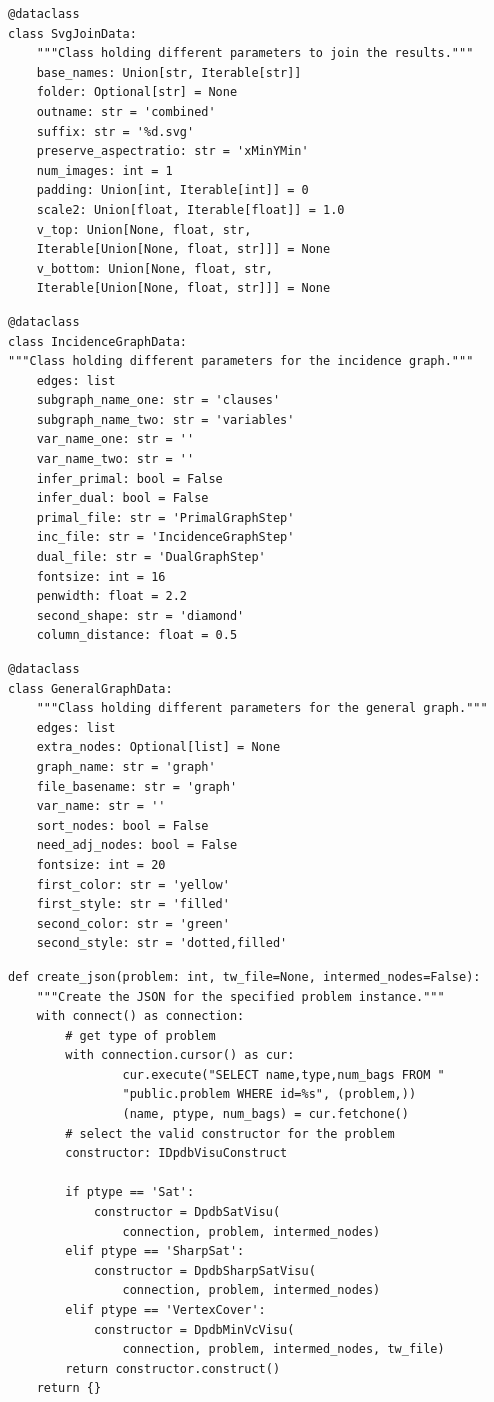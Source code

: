 \documentclass[a4paper, 12pt, bibliography=totoc]{scrartcl}
\begin{document}
\begin{lstlisting}[style=custompy, caption={SvgJoinData}, label={lst:svgjoindataclass}]
@dataclass
class SvgJoinData:
	"""Class holding different parameters to join the results."""
	base_names: Union[str, Iterable[str]]
	folder: Optional[str] = None
	outname: str = 'combined'
	suffix: str = '%d.svg'
	preserve_aspectratio: str = 'xMinYMin'
	num_images: int = 1
	padding: Union[int, Iterable[int]] = 0
	scale2: Union[float, Iterable[float]] = 1.0
	v_top: Union[None, float, str, 
	Iterable[Union[None, float, str]]] = None
	v_bottom: Union[None, float, str, 
	Iterable[Union[None, float, str]]] = None	
\end{lstlisting}

\begin{lstlisting}[style=custompy, caption={IncidenceGraphData}, label={lst:incidencedata}]
@dataclass
class IncidenceGraphData:
"""Class holding different parameters for the incidence graph."""
	edges: list
	subgraph_name_one: str = 'clauses'
	subgraph_name_two: str = 'variables'
	var_name_one: str = ''
	var_name_two: str = ''
	infer_primal: bool = False
	infer_dual: bool = False
	primal_file: str = 'PrimalGraphStep'
	inc_file: str = 'IncidenceGraphStep'
	dual_file: str = 'DualGraphStep'
	fontsize: int = 16
	penwidth: float = 2.2
	second_shape: str = 'diamond'
	column_distance: float = 0.5
\end{lstlisting}\pagebreak

\begin{lstlisting}[style=custompy, caption={GeneralGraphData}, label={lst:gengraphdata}]
@dataclass
class GeneralGraphData:
	"""Class holding different parameters for the general graph."""
	edges: list
	extra_nodes: Optional[list] = None
	graph_name: str = 'graph'
	file_basename: str = 'graph'
	var_name: str = ''
	sort_nodes: bool = False
	need_adj_nodes: bool = False
	fontsize: int = 20
	first_color: str = 'yellow'
	first_style: str = 'filled'
	second_color: str = 'green'
	second_style: str = 'dotted,filled'
\end{lstlisting}

\begin{lstlisting}[style=custompy, caption={Construct\_dpdb\_visu.py}, label={lst:create-json}]
def create_json(problem: int, tw_file=None, intermed_nodes=False):
	"""Create the JSON for the specified problem instance."""
	with connect() as connection:
		# get type of problem
		with connection.cursor() as cur:
				cur.execute("SELECT name,type,num_bags FROM "
				"public.problem WHERE id=%s", (problem,))
				(name, ptype, num_bags) = cur.fetchone()	
		# select the valid constructor for the problem
		constructor: IDpdbVisuConstruct
		
		if ptype == 'Sat':
			constructor = DpdbSatVisu(
				connection, problem, intermed_nodes)
		elif ptype == 'SharpSat':
			constructor = DpdbSharpSatVisu(
				connection, problem, intermed_nodes)
		elif ptype == 'VertexCover':
			constructor = DpdbMinVcVisu(
				connection, problem, intermed_nodes, tw_file)
		return constructor.construct()
	return {} 
\end{lstlisting}
\end{document}
